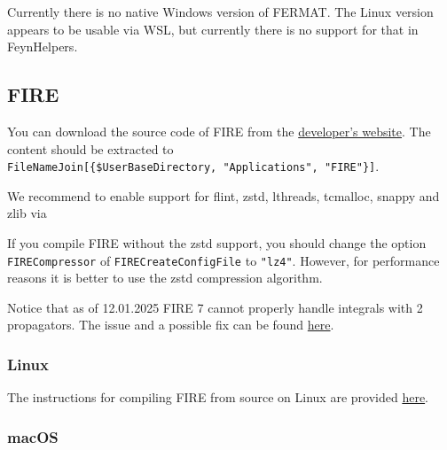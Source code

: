 \documentclass[../FeynHelpersManual.tex]{subfiles}
\begin{document}
Currently there is no native Windows version of FERMAT. The Linux
version appears to be usable via WSL, but currently there is no support
for that in FeynHelpers.

\subsection{FIRE}\label{fire}

You can download the source code of FIRE from the
\href{https://gitlab.srcc.msu.ru/feynmanintegrals/fire}{developer's
website}. The content should be extracted to
\texttt{FileNameJoin[\allowbreak{}\{\allowbreak{}\$UserBaseDirectory,\ \allowbreak{}"Applications",\ \allowbreak{}"FIRE"\}]}.

We recommend to enable support for flint, zstd, lthreads, tcmalloc,
snappy and zlib via

\begin{Shaded}
\begin{Highlighting}[]
\SpecialCharTok{/}\SpecialCharTok{{-}{-}}\SpecialCharTok{{-}{-}}\SpecialCharTok{{-}{-}}\SpecialCharTok{{-}{-}}\SpecialCharTok{{-}{-}}\SpecialCharTok{{-}{-}}
\end{Highlighting}
\end{Shaded}

If you compile FIRE without the zstd support, you should change the
option \texttt{FIRECompressor} of \texttt{FIRECreateConfigFile} to
\texttt{"lz4"}. However, for performance reasons it is better to use the
zstd compression algorithm.

Notice that as of 12.01.2025 FIRE 7 cannot properly handle integrals
with 2 propagators. The issue and a possible fix can be found
\href{https://gitlab.com/feynmanintegrals/fire/-/issues/40\#note_2994322049}{here}.

\subsubsection{Linux}\label{linux-1}

The instructions for compiling FIRE from source on Linux are provided
\href{https://bitbucket.org/feynmanIntegrals/fire/src/master/}{here}.

\subsubsection{macOS}\label{macos-1}
\end{document}
